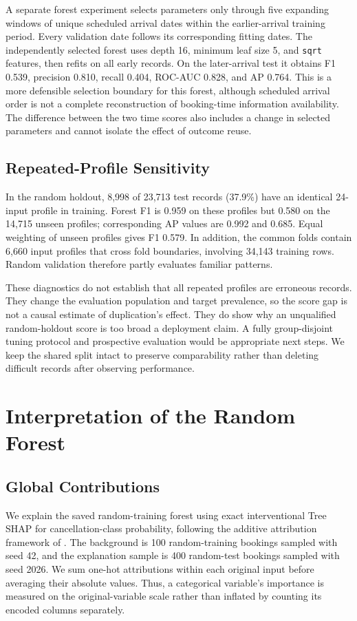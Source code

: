 A separate forest experiment selects parameters only through five expanding windows of unique scheduled arrival dates within the earlier-arrival training period. Every validation date follows its corresponding fitting dates. The independently selected forest uses depth 16, minimum leaf size 5, and \texttt{sqrt} features, then refits on all early records. On the later-arrival test it obtains F1 0.539, precision 0.810, recall 0.404, ROC-AUC 0.828, and AP 0.764. This is a more defensible selection boundary for this forest, although scheduled arrival order is not a complete reconstruction of booking-time information availability. The difference between the two time scores also includes a change in selected parameters and cannot isolate the effect of outcome reuse.

\subsection{Repeated-Profile Sensitivity}
In the random holdout, 8,998 of 23,713 test records (37.9\%) have an identical 24-input profile in training. Forest F1 is 0.959 on these profiles but 0.580 on the 14,715 unseen profiles; corresponding AP values are 0.992 and 0.685. Equal weighting of unseen profiles gives F1 0.579. In addition, the common folds contain 6,660 input profiles that cross fold boundaries, involving 34,143 training rows. Random validation therefore partly evaluates familiar patterns.

These diagnostics do not establish that all repeated profiles are erroneous records. They change the evaluation population and target prevalence, so the score gap is not a causal estimate of duplication's effect. They do show why an unqualified random-holdout score is too broad a deployment claim. A fully group-disjoint tuning protocol and prospective evaluation would be appropriate next steps. We keep the shared split intact to preserve comparability rather than deleting difficult records after observing performance.

\section{Interpretation of the Random Forest}
\subsection{Global Contributions}
We explain the saved random-training forest using exact interventional Tree SHAP for cancellation-class probability, following the additive attribution framework of \citet{lundberg2017}. The background is 100 random-training bookings sampled with seed 42, and the explanation sample is 400 random-test bookings sampled with seed 2026. We sum one-hot attributions within each original input before averaging their absolute values. Thus, a categorical variable's importance is measured on the original-variable scale rather than inflated by counting its encoded columns separately.

